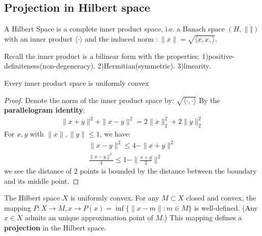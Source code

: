 \subsection{Projection in Hilbert space}
\begin{definition}
	A Hilbert Space is a complete inner product space, i.e. a Banach space $(H, \|\dot\|)$ with an inner product $\langle \cdot \rangle$ and the induced norm $:\|x\| = \sqrt{\langle x, x, \rangle}$. 
\end{definition}
\begin{remark}
Recall the inner product is a bilinear form with the properties: 1)positive-definiteness(non-degeneracy). 2)Hermitian(symmetric).  3)linearity.	
\end{remark}

\begin{lemma}
	Every inner product space is uniformly convex
\end{lemma}
\begin{proof}
	Denote the norm of the inner product space by: $\sqrt{\langle \cdot , \cdot \rangle}$
	By the \textbf{parallelogram identity}:
	\begin{align*}
		\|x + y\|^2 + \|x - y\|^2 =  2\|x\|_2^2 + 2\|y\|_2^2 
	\end{align*}
	For $x, y$ with $\|x\|, \|y\| \leq 1$, we have:
	\begin{align*}
		\|x - y\|^2 \leq 4 - \|x+y\|^2\\
		\frac{\|x -y\|^2}{4} \leq 1 - \|\frac{x + y}{2}\|^2
	\end{align*}
	we see the distance of 2 points is bounded by the distance between the boundary and its middle point. 
\end{proof}

\begin{corollary}
	The Hilbert space $X$ is uniformly convex. For any $M \subset X$ closed and convex, the mapping $P:X \rightarrow M, x \rightarrow  P(x) = \inf\{ \| x - m \|: m \in M \}$ is well-defined. (Any $x \in X$ admits an unique approximation point of $M$.) This mapping defines a \textbf{projection} in the Hilbert space. 
\end{corollary}

